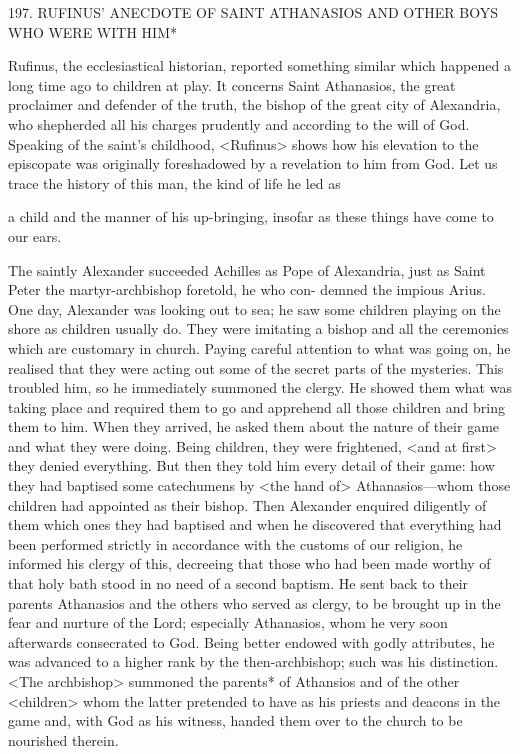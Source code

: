 197. RUFINUS' ANECDOTE OF SAINT ATHANASIOS
AND OTHER BOYS WHO WERE WITH HIM*

Rufinus, the ecclesiastical historian, reported something similar
which happened a long time ago to children at play. It concerns
Saint Athanasios, the great proclaimer and defender of the truth, the
bishop of the great city of Alexandria, who shepherded all his
charges prudently and according to the will of God. Speaking of the
saint's childhood, <Rufinus> shows how his elevation to the
episcopate was originally foreshadowed by a revelation to him from
God. Let us trace the history of this man, the kind of life he led as

a child and the manner of his up-bringing, insofar as these things
have come to our ears.

The saintly Alexander succeeded Achilles as Pope of Alexandria,
just as Saint Peter the martyr-archbishop foretold, he who con-
demned the impious Arius. One day, Alexander was looking out to
sea; he saw some children playing on the shore as children usually
do. They were imitating a bishop and all the ceremonies which are
customary in church. Paying careful attention to what was going on,
he realised that they were acting out some of the secret parts of the
mysteries. This troubled him, so he immediately summoned the
clergy. He showed them what was taking place and required them
to go and apprehend all those children and bring them to him.
When they arrived, he asked them about the nature of their game
and what they were doing. Being children, they were frightened,
<and at first> they denied everything. But then they told him every
detail of their game: how they had baptised some catechumens by
<the hand of> Athanasios—whom those children had appointed as
their bishop. Then Alexander enquired diligently of them which ones
they had baptised and when he discovered that everything had been
performed strictly in accordance with the customs of our religion,
he informed his clergy of this, decreeing that those who had been
made worthy of that holy bath stood in no need of a second
baptism. He sent back to their parents Athanasios and the others
who served as clergy, to be brought up in the fear and nurture of
the Lord; especially Athanasios, whom he very soon afterwards
consecrated to God. Being better endowed with godly attributes, he
was advanced to a higher rank by the then-archbishop; such was his
distinction. <The archbishop> summoned the parents* of Athansios
and of the other <children> whom the latter pretended to have as
his priests and deacons in the game and, with God as his witness,
handed them over to the church to be nourished therein.

